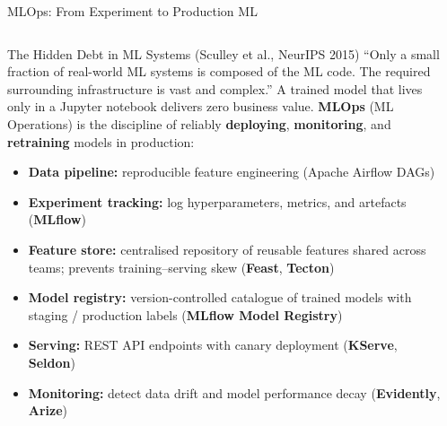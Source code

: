 \documentclass[aspectratio=169,10pt]{beamer}
\begin{document}
\begin{frame}{MLOps: From Experiment to Production ML}
  \begin{columns}[T]
      \begin{block}{The Hidden Debt in ML Systems (Sculley et al., NeurIPS 2015)}
        ``Only a small fraction of real-world ML systems is composed of the ML code.  The required surrounding infrastructure is vast and complex.''
        \vspace{4pt}
        A trained model that lives only in a Jupyter notebook delivers zero business value.  \textbf{MLOps} (ML Operations) is the discipline of reliably \textbf{deploying}, \textbf{monitoring}, and \textbf{retraining} models in production:
        \begin{itemize}
          \item \textbf{Data pipeline:} reproducible feature engineering (Apache Airflow DAGs)
          \item \textbf{Experiment tracking:} log hyperparameters, metrics, and artefacts (\textbf{MLflow})
          \item \textbf{Feature store:} centralised repository of reusable features shared across teams; prevents training--serving skew (\textbf{Feast}, \textbf{Tecton})
          \item \textbf{Model registry:} version-controlled catalogue of trained models with staging / production labels (\textbf{MLflow Model Registry})
          \item \textbf{Serving:} REST API endpoints with canary deployment (\textbf{KServe}, \textbf{Seldon})
          \item \textbf{Monitoring:} detect data drift and model performance decay (\textbf{Evidently}, \textbf{Arize})
        \end{itemize}
      \end{block}

      \begin{center}
\end{center}
\end{columns}
\end{frame}
\end{document}
